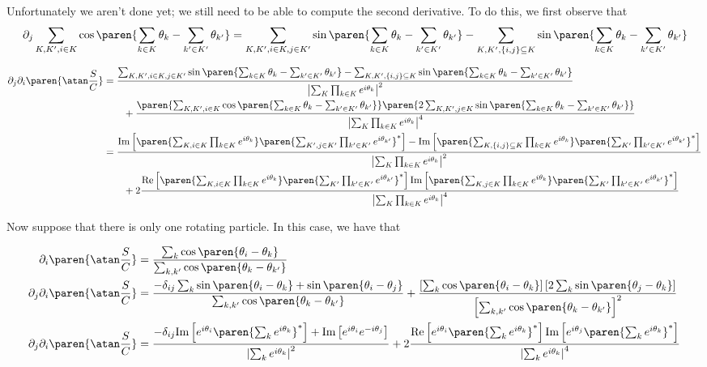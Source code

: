 \documentclass[onecolumn,amsmath,amssymb,nofootinbib,floatfix]{revtex4}
\begin{document}
Unfortunately we aren't done yet;  we still need to be able to compute the second derivative.  To do this, we first observe that
$$\partial_j \sum_{K,K',i\in K}\cos\paren{\sum_{k\in K} \theta_k - \sum_{k'\in K'} \theta_{k'}} = \sum_{K,K',i\in K,j\in K'}\sin\paren{\sum_{k\in K} \theta_k - \sum_{k'\in K'} \theta_{k'}} - \sum_{K,K',\{i,j\}\subseteq K}\sin\paren{\sum_{k\in K} \theta_k - \sum_{k'\in K'} \theta_{k'}}
$$

$$
\begin{aligned}
\partial_j \partial_i \paren{\atan\frac{S}{C}}
&= \frac{\sum_{K,K',i\in K,j\in K'}\sin\paren{\sum_{k\in K} \theta_k - \sum_{k'\in K'} \theta_{k'}} - \sum_{K,K',\{i,j\}\subseteq K}\sin\paren{\sum_{k\in K} \theta_k - \sum_{k'\in K'} \theta_{k'}}}{\left|\sum_{K}\prod_{k\in K}e^{i\theta_k}\right|^2}\\
&\qquad+ \frac{\paren{\sum_{K,K',i\in K}\cos\paren{\sum_{k\in K} \theta_k - \sum_{k'\in K'} \theta_{k'}}}\paren{2\sum_{K,K',j\in K}\sin\paren{\sum_{k\in K} \theta_k - \sum_{k'\in K'} \theta_{k'}}}}{\left|\sum_{K}\prod_{k\in K}e^{i\theta_k}\right|^4}\\
&= \frac{\text{Im}\left[\paren{\sum_{K,i\in K}\prod_{k\in K}e^{i\theta_k}}\paren{\sum_{K',j\in K'}\prod_{k'\in K'}e^{i\theta_{k'}}}^*\right]-\text{Im}\left[\paren{\sum_{K,\{i,j\}\subseteq K}\prod_{k\in K}e^{i\theta_k}}\paren{\sum_{K'}\prod_{k'\in K'}e^{i\theta_{k'}}}^*\right]}{\left|\sum_{K}\prod_{k\in K}e^{i\theta_k}\right|^2}\\
&\qquad+ 2\frac{\text{Re}\left[\paren{\sum_{K,i\in K}\prod_{k\in K}e^{i\theta_k}}\paren{\sum_{K'}\prod_{k'\in K'}e^{i\theta_{k'}}}^*\right]\text{Im}\left[\paren{\sum_{K,j\in K}\prod_{k\in K}e^{i\theta_k}}\paren{\sum_{K'}\prod_{k'\in K'}e^{i\theta_{k'}}}^*\right]}{\left|\sum_{K}\prod_{k\in K}e^{i\theta_k}\right|^4}
\end{aligned}
$$

Now suppose that there is only one rotating particle.  In this case, we have that

$$
\begin{aligned}
\partial_i \paren{\atan\frac{S}{C}} &= \frac{\sum_{k}\cos\paren{\theta_i - \theta_k}}
                                            {\sum_{k,k'}\cos\paren{\theta_k - \theta_{k'}}}\\
\partial_j\partial_i \paren{\atan\frac{S}{C}} &=
\frac{-\delta_{ij}\sum_k\sin\paren{\theta_i - \theta_k} + \sin\paren{\theta_i - \theta_j}}{\sum_{k,k'}\cos\paren{\theta_k - \theta_{k'}}}
+\frac{\left[\sum_{k}\cos\paren{\theta_i - \theta_k}\right]\left[2\sum_{k}\sin\paren{\theta_j - \theta_k}\right]}{\left[\sum_{k,k'}\cos\paren{\theta_k - \theta_{k'}}\right]^2}\\
\partial_j\partial_i \paren{\atan\frac{S}{C}} &=
\frac{-\delta_{ij}\text{Im}\left[e^{i\theta_i}\paren{\sum_k e^{i\theta_k}}^*\right] + \text{Im}\left[e^{i\theta_i}e^{-i\theta_j}\right]}{\left|\sum_k e^{i\theta_k}\right|^2}
+2\frac{\text{Re}\left[e^{i\theta_i}\paren{\sum_k e^{i\theta_k}}^*\right]\text{Im}\left[e^{i\theta_j}\paren{\sum_k e^{i\theta_k}}^*\right]}{\left|\sum_k e^{i\theta_k}\right|^4}\\
\end{aligned}
$$
\end{document}

